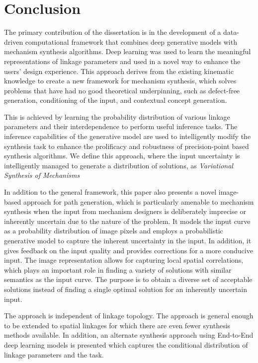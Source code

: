 \chapter{Conclusion}

The primary contribution of the dissertation is in the development of a data-driven computational framework that combines deep generative models with mechanism synthesis algorithms. Deep learning was used to learn the meaningful representations of linkage parameters and used in a novel way to enhance the users' design experience. This approach derives from the existing kinematic knowledge to create a new framework for mechanism synthesis, which solves problems that have had no good theoretical underpinning, such as defect-free generation, conditioning of the input, and contextual concept generation. 

This is achieved by learning the probability distribution of various linkage parameters and their interdependence to perform useful inference tasks. The inference capabilities of the generative model are used to intelligently modify the synthesis task to enhance the prolificacy and robustness of precision-point based synthesis algorithms.  We define this approach, where the input uncertainty is intelligently managed to generate a distribution of solutions, as \emph{Variational Synthesis of Mechanisms}

In addition to the general framework, this paper also presents a novel image-based approach for path generation, which is particularly amenable to mechanism synthesis when the input from mechanism designers is deliberately imprecise or inherently uncertain due to the nature of the problem. It models the input curve as a probability distribution of image pixels and employs a probabilistic generative model to capture the inherent uncertainty in the input. In addition, it gives feedback on the input quality and provides corrections for a more conducive input. The image representation allows for capturing local spatial correlations, which plays an important role in finding a variety of solutions with similar semantics as the input curve. The purpose is to obtain a diverse set of acceptable solutions instead of finding a single optimal solution for an inherently uncertain input.


The approach is independent of linkage topology. The approach is general enough to be extended to spatial linkages for which there are even fewer synthesis methods available. In addition, an alternate synthesis approach using End-to-End deep learning models is presented which captures the conditional distribution of linkage parameters and the task.  


